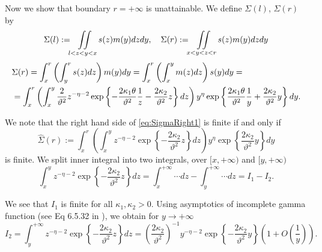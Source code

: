 \documentclass[11pt,a4paper] {article}
\begin{document}
Now we show that boundary $r=+\infty$ is unattainable. We define $\Sigma(l)$, $\Sigma(r)$ by
\begin{equation}\label{eq:SigmaLeftRight}
\Sigma(l):=\iint\limits_{l<z<y<x}s(z)m(y)dzdy,\quad 
\Sigma(r):=\iint\limits_{x<y<z<r}s(z)m(y)dzdy\vspace*{-0.5\baselineskip}
\end{equation}\vspace*{-1.0\baselineskip}
\begin{equation}\label{eq:SigmaRight1}
\begin{split}
&\Sigma(r)=\int_x^r\left(\int_y^r s(z)dz\right)m(y)dy=
\int_x^r\left(\int_x^y m(z)dz\right)s(y)dy=\\
&=\int_x^r\left(\int_x^y \frac{2}{\vartheta^2}z^{-\eta-2}\exp\left\{-\frac{2\kappa_1\theta}{\vartheta^2}\frac{1}{z}-\frac{2\kappa_2}{\vartheta^2}z\right\}dz\right)y^\eta\exp\left\{\frac{2\kappa_1\theta}{\vartheta^2}\frac{1}{y}+\frac{2\kappa_2}{\vartheta^2}y\right\}dy.\vspace*{-1\baselineskip}
\end{split}
\end{equation}

We note that the right hand side of \eqref{eq:SigmaRight1} is finite if and only if\vspace*{-0.5\baselineskip}
\begin{equation}\label{eq:SigmaRight2}
\widehat\Sigma(r):=\int_x^r\left(\int_x^yz^{-\eta-2}\exp\left\{-\frac{2\kappa_2}{\vartheta^2}z\right\}dz\right)y^\eta\exp\left\{\frac{2\kappa_2}{\vartheta^2}y\right\}dy
\end{equation}
is finite. We split inner integral into two integrals, over $[x,+\infty)$ and $[y,+\infty)$
\begin{equation}\label{eq:SigmaRight3}
\int_x^yz^{-\eta-2}\exp\left\{-\frac{2\kappa_2}{\vartheta^2}z\right\}dz=
\int_x^{+\infty} \cdots dz-\int_y^{+\infty} \cdots dz=I_1-I_2.
\end{equation}

We see that $I_1$ is finite for all $\kappa_1, \kappa_2>0$. Using asymptotics of incomplete gamma function (see Eq 6.5.32 in \cite{AbramSteg}), we obtain for $y\to +\infty$
\begin{equation}\label{eq:SigmaRight4}
I_2=\int_y^{+\infty}z^{-\eta-2}\exp\left\{-\frac{2\kappa_2}{\vartheta^2}z\right\}dz=
\left(\frac{2\kappa_2}{\vartheta^2}\right)^{-1}y^{-\eta-2}\exp\left\{-\frac{2\kappa_2}{\vartheta^2}y\right\}\left(1+O\left(\frac{1}{y}\right)\right).
\end{equation}
\end{document}

